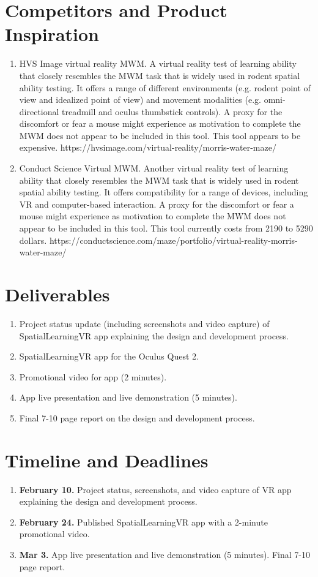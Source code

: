 \documentclass{report}
\begin{document}
\section*{Competitors and Product Inspiration}
\begin{enumerate}
    \item HVS Image virtual reality MWM. A virtual reality test of learning ability that closely resembles the MWM task that is widely used in rodent spatial ability testing. It offers a range of different environments (e.g. rodent point of view and idealized point of view) and movement modalities (e.g. omni-directional treadmill and oculus thumbstick controls). A proxy for the discomfort or fear a mouse might experience as motivation to complete the MWM does not appear to be included in this tool. This tool appears to be expensive. https://hvsimage.com/virtual-reality/morris-water-maze/
    \item Conduct Science Virtual MWM. Another virtual reality test of learning ability that closely resembles the MWM task that is widely used in rodent spatial ability testing. It offers compatibility for a range of devices, including VR and computer-based interaction.  A proxy for the discomfort or fear a mouse might experience as motivation to complete the MWM does not appear to be included in this tool. This tool currently costs from 2190 to 5290 dollars. https://conductscience.com/maze/portfolio/virtual-reality-morris-water-maze/
\end{enumerate}

\section*{Deliverables}
\begin{enumerate}
  \item Project status update (including screenshots and video capture) of SpatialLearningVR app explaining the design and development process.
  \item SpatialLearningVR app for the Oculus Quest 2.
  \item Promotional video for app (2 minutes).
  \item App live presentation and live demonstration (5 minutes).
  \item Final 7-10 page report on the design and development process.
\end{enumerate}

\section*{Timeline and Deadlines}
\begin{enumerate}
  \item \textbf{February 10.} Project status, screenshots, and video capture of VR app explaining the design and development process.
  \item \textbf{February 24.} Published SpatialLearningVR app with a 2-minute promotional video.
  \item \textbf{Mar 3.} App live presentation and live demonstration (5 minutes). Final 7-10 page report.
\end{enumerate}
\end{document}
